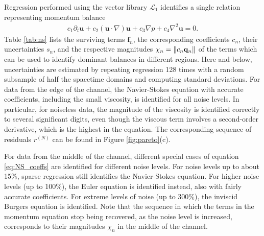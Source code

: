\documentclass[preprint]{article}
\def\bi#1{\textbf{#1}}
\begin{document}
\begin{figure*}
\centering
{} %
\hspace{2mm}
\hspace{2mm}
\caption{
Dependence of the residual $r$ on the number of terms $N$ retained in a given relation in the noiseless case. Black (white) squares represent data collected near the edge (in the middle) of the channel. The identified relations are (a) the energy equation, (b) the pressure equation,
and (c) the momentum equation.}
\label{fig:pareto}
\end{figure*}

Regression performed using the vector library $\mathcal{L}_1$ identifies a single relation representing momentum balance
\begin{align}\label{eq:NS_coeffs}
    c_1\partial_t {\bi u} + c_2({\bi u}\cdot \nabla){\bi u} + c_3\nabla p + c_4 \nabla^2 {\bi u}= 0. 
\end{align}
Table \ref{tab:ns} lists the surviving terms ${\bi f}_n$, the corresponding coefficients $c_n$, their uncertainties $s_n$, and the respective magnitudes $\chi_n=\|c_n{\bf q}_n\|$ of the terms which can be used to identify dominant balances in different regions. 
Here and below, uncertainties are estimated by repeating regression 128 times with a random subsample of half the spacetime domains and computing standard deviations.
For data from the edge of the channel, the Navier-Stokes equation with accurate coefficients, including the small viscosity, is identified for all noise levels. In particular, for noiseless data, the magnitude of the viscosity is identified correctly to several significant digits, even though the viscous term involves a second-order derivative, which is the highest in the equation. The corresponding sequence of residuals $r^{(N)}$ can be found in Figure \ref{fig:pareto}(c). 
 
For data from the middle of the channel, different special cases of equation \eqref{eq:NS_coeffs} are identified for different noise levels. For noise levels up to about 15\%, sparse regression still identifies the Navier-Stokes equation. For higher noise levels (up to 100\%), the Euler equation is identified instead, also with fairly accurate coefficients. For extreme levels of noise (up to 300\%), the inviscid Burgers equation is identified. Note that the sequence in which the terms in the momentum equation stop being recovered, as the noise level is increased, corresponds to their magnitudes $\chi_n$ in the middle of the channel.
\end{document}
